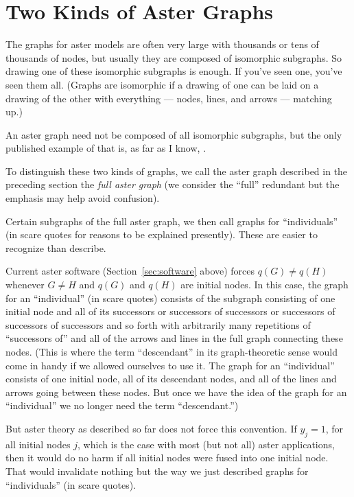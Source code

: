 \section{Two Kinds of Aster Graphs}
\label{sec:scare-quotes}

The graphs for aster models are often very large with thousands or tens of
thousands of nodes, but usually they are composed of isomorphic subgraphs.
So drawing one of these isomorphic subgraphs is enough.
If you've seen one, you've seen them all.
(Graphs are isomorphic if a drawing of one can be laid on a drawing of the
other with everything --- nodes, lines, and arrows --- matching up.)

An aster graph need not be composed of all isomorphic subgraphs,
but the only published example of that is, as far as I know,
\citet{aster-hornworm}.

To distinguish these two kinds of graphs, we call the aster graph described
in the preceding section the \emph{full aster graph} (we consider the ``full''
redundant but the emphasis may help avoid confusion).

Certain subgraphs of the full aster graph, we then call graphs
for ``individuals'' (in scare quotes for reasons to be explained presently).
These are easier to recognize than describe.

Current aster software (Section~\ref{sec:software} above) forces
$q(G) \neq q(H)$ whenever $G \neq H$ and $q(G)$ and $q(H)$ are initial nodes.
In this case, the graph for an ``individual'' (in scare quotes)
consists of the subgraph consisting of one initial node and all of its
successors or successors of successors or successors of successors
of successors and so forth with arbitrarily many repetitions
of ``successors of'' and all of the arrows and lines in the full graph
connecting these nodes.
(This is where the term ``descendant'' in its graph-theoretic sense would
come in handy if we allowed ourselves to use it.  The graph for an
``individual'' consists of one initial node, all of its descendant nodes,
and all of the lines and arrows going between these nodes.  But once we
have the idea of the graph for an ``individual'' we no longer need the
term ``descendant.'')

But aster theory as described so far does not force this convention.
If $y_j = 1$, for all initial nodes $j$, which is the case with most
(but not all) aster applications, then it would do no harm if all initial
nodes were fused into one initial node.  That would invalidate nothing but
the way we just described graphs for ``individuals'' (in scare quotes).

